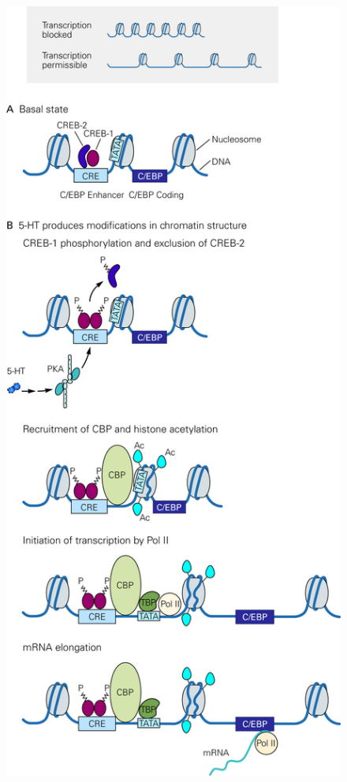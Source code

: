\documentclass[UTF8,nofonts]{ctexart}
\begin{document}
\begin{figure}[h]
	\centering
	\includegraphics[scale=0.9]{Pic/6607_PNS5.jpg}
\end{figure}
\par
\end{document}
